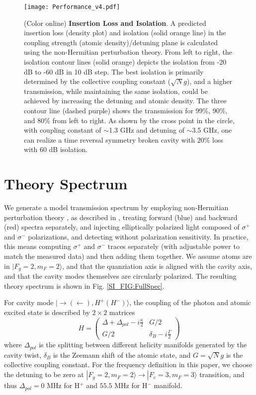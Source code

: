 \documentclass[aps,pra,twocolumn,groupedaddress,10pt,showpacs]{revtex4-1}
\newcommand{\ket}[1]{| #1\rangle}
\begin{document}
\begin{figure}
\texttt{[image: Performance\_v4.pdf]}
\caption{(Color online) \textbf{Insertion Loss and Isolation}. A predicted insertion loss (density plot) and isolation (solid orange line) in the coupling strength (atomic density)/detuning plane is calculated using the non-Hermitian perturbation theory. From left to right, the isolation contour lines (solid orange) depicts the isolation from -20 dB to -60 dB in 10 dB step. The best isolation is primarily determined by the collective coupling constant ($\sqrt{N}g$), and a higher transmission, while maintaining the same isolation, could be achieved by increasing the detuning and atomic density. The three contour line (dashed purple) shows the transmission for 99\%, 90\%, and 80\% from left to right. As shown by the cross point in the circle, with coupling constant of $\sim$1.3 GHz and detuning of $\sim$3.5 GHz, one can realize a time reversal symmetry broken cavity with 20\% loss with 60 dB isolation.}
\label{SI_FIG:LossAndIsolation}
\end{figure}

\section{Theory Spectrum}
\label{App:TheorySpectrum}
We generate a model transmission spectrum by employing non-Hermitian perturbation theory \cite{cohe2004atom}, as described in \cite{somm2015quan}, treating forward (blue) and backward (red) spectra separately, and injecting elliptically polarized light composed of $\sigma^+$ and $\sigma^-$ polarizations, and detecting without polarization sensitivity. In practice, this means computing $\sigma^+$ and $\sigma^-$ traces separately (with adjustable power to match the measured data) and then adding them together. We assume atoms are in $|F_g=2,m_F=2\rangle$, and that the quanziation axis is aligned with the cavity axis, and that the cavity modes themselves are circularly polarized. The resulting theory spectrum is shown in Fig. \ref{SI_FIG:FullSpec}.

For cavity mode $\ket{\rightarrow(\leftarrow),H^+(H^-)}$, the coupling of the photon and atomic excited state is described by $2\times2$ matrices
\begin{equation}
H =
\begin{pmatrix}
\Delta+\Delta_{pol}-i\frac{\kappa}{2} & G/2 \\
G/2 & \delta_B-i\frac{\Gamma}{2}
\end{pmatrix}
\end{equation}
where $\Delta_{pol}$ is the splitting between different helicity manifolds generated by the cavity twist, $\delta_B$ is the Zeemann shift of the atomic state, and $G=\sqrt{N}g$ is the collective coupling constant. For the frequency definition in this paper, we choose the detuning to be zero at $\ket{F_g=2,m_F=2} \rightarrow \ket{F_e=3,m_F=3}$ transition, and thus $\Delta_{pol}=0$ MHz for H$^+$ and $55.5$ MHz for H$^-$ manifold. 
\end{document}
